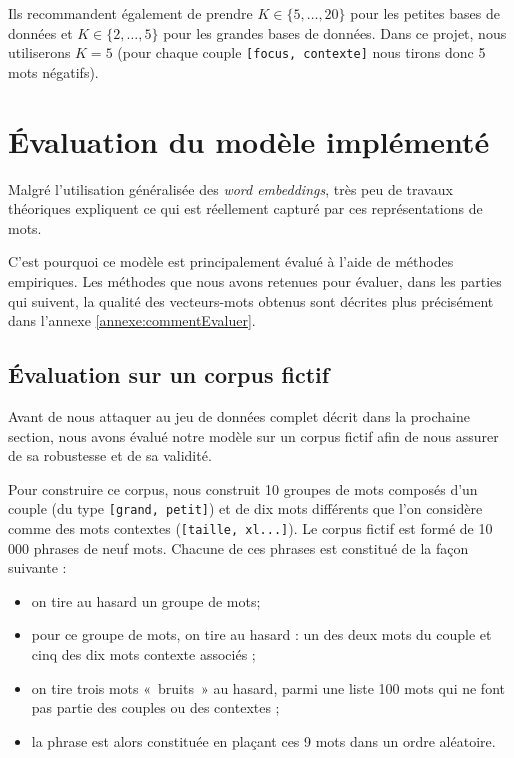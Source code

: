 \documentclass[11pt,french,french]{article}
\providecommand{\tightlist}{%
  \setlength{\parskip}{0pt}
  }
\begin{document}
Ils recommandent également de prendre \(K\in\{5,\dots,20\}\) pour les petites bases de données et \(K\in\{2,\dots,5\}\) pour les grandes bases de données. Dans ce projet, nous utiliserons \(K=5\) (pour chaque couple \texttt{{[}focus,\ contexte{]}} nous tirons donc 5 mots négatifs).

\hypertarget{sec:evaluation}{%
\section{Évaluation du modèle implémenté}\label{sec:evaluation}}

Malgré l'utilisation généralisée des \emph{word embeddings}, très peu de travaux théoriques expliquent ce qui est réellement capturé par ces représentations de mots.

C'est pourquoi ce modèle est principalement évalué à l'aide de méthodes empiriques.
Les méthodes que nous avons retenues pour évaluer, dans les parties qui suivent, la qualité des vecteurs-mots obtenus sont décrites plus précisément dans l'annexe \ref{annexe:commentEvaluer}.

\hypertarget{sec:corpusFictif}{%
\subsection{Évaluation sur un corpus fictif}\label{sec:corpusFictif}}

Avant de nous attaquer au jeu de données complet décrit dans la prochaine section, nous avons évalué notre modèle sur un corpus fictif afin de nous assurer de sa robustesse et de sa validité.

Pour construire ce corpus, nous construit 10 groupes de mots composés d'un couple (du type \texttt{{[}grand,\ petit{]}}) et de dix mots différents que l'on considère comme des mots contextes (\texttt{{[}taille,\ xl...{]}}). Le corpus fictif est formé de 10 000 phrases de neuf mots. Chacune de ces phrases est constitué de la façon suivante :

\begin{itemize}
\tightlist
\item
  on tire au hasard un groupe de mots;
\item
  pour ce groupe de mots, on tire au hasard : un des deux mots du couple et cinq des dix mots contexte associés ;
\item
  on tire trois mots «~bruits~» au hasard, parmi une liste 100 mots qui ne font pas partie des couples ou des contextes ;
\item
  la phrase est alors constituée en plaçant ces 9 mots dans un ordre aléatoire.
\end{itemize}
\end{document}
